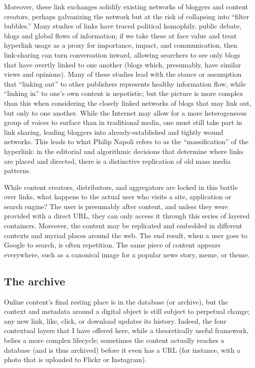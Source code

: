 Moreover, these link exchanges solidify existing networks of bloggers and content creators, perhaps galvanizing the network but at the risk of collapsing into ``filter bubbles.'' Many studies of links have traced political homophily, public debate, blogs and global flows of information; if we take these at face value and treat hyperlink usage as a proxy for importance, impact, and communication, then link-sharing can turn conversation inward, allowing searchers to see only blogs that have overtly linked to one another (blogs which, presumably, have similar views and opinions).\autocite{graells-garrido_data_2013} Many of these studies lead with the stance or assumption that ``linking out'' to other publishers represents healthy information flow, while ``linking in'' to one's own content is nepotistic; but the picture is more complex than this when considering the closely linked networks of blogs that may link out, but only to one another. While the Internet may allow for a more heterogeneous group of voices to surface than in traditional media, one must still take part in link sharing, leading bloggers into already-established and tightly wound networks. This leads to what Philip Napoli refers to as the ``massification'' of the hyperlink: in the editorial and algorithmic decisions that determine where links are placed and directed, there is a distinctive replication of old mass media patterns.\autocite{tsui_hyperlinking_2008}

While content creators, distributors, and aggregators are locked in this battle over links, what happens to the actual user who visits a site, application or search engine? The user is presumably after content, and unless they were provided with a direct URL, they can only access it through this series of layered containers. Moreover, the content may be replicated and embedded in different contexts and myriad places around the web. The end result, when a user goes to Google to search, is often repetition. The same piece of content appears everywhere, such as a canonical image for a popular news story, meme, or theme.

\subsection{The archive}

Online content's final resting place is in the database (or archive), but the context and metadata around a digital object is still subject to perpetual change; any new link, like, click, or download updates its history. Indeed, the four contextual layers that I have offered here, while a theoretically useful framework, belies a more complex lifecycle; sometimes the content actually reaches a database (and is thus archived) before it even has a URL (for instance, with a photo that is uploaded to Flickr or Instagram).

